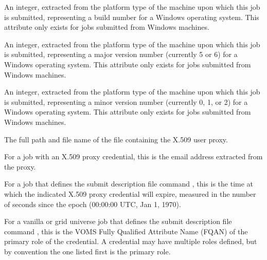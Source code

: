 \begin{description}
\item[\AdAttr{WindowsBuildNumber}:] An integer, extracted from the
platform type of the machine upon which this job is submitted,
representing a build number for a Windows operating system.
This attribute only exists for jobs submitted from Windows machines.

\item[\AdAttr{WindowsMajorVersion}:] An integer, extracted from the
platform type of the machine upon which this job is submitted,
representing a major version number (currently 5 or 6)
for a Windows operating system.
This attribute only exists for jobs submitted from Windows machines.

\item[\AdAttr{WindowsMinorVersion}:] An integer, extracted from the
platform type of the machine upon which this job is submitted, 
representing a minor version number (currently 0, 1, or 2)
for a Windows operating system.
This attribute only exists for jobs submitted from Windows machines.

\item[\AdAttr{X509UserProxy}:]   
The full path and file name of the file containing the X.509 user proxy.

\item[\AdAttr{X509UserProxyEmail}:]   
\item For a job with an X.509 proxy credential, this is the email
address extracted from the proxy.

\item[\AdAttr{X509UserProxyExpiration}:]   
For a job that defines the submit description file command
, this is the time at which the indicated
X.509 proxy credential will expire, measured in the
number of seconds since the epoch (00:00:00 UTC, Jan 1, 1970).

\item[\AdAttr{X509UserProxyFirstFQAN}:]   
For a vanilla or grid universe job that defines the submit description
file command , 
this is the VOMS Fully Qualified Attribute Name (FQAN) of
the primary role of the credential. 
A credential may have multiple roles defined, 
but by convention the one listed first is the primary role. 


\end{description}
